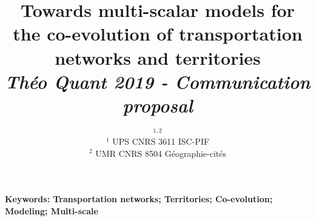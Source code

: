 




\title{\vspace{-1.5cm}Towards multi-scalar models for the co-evolution of transportation networks and territories\\\medskip
\textit{Théo Quant 2019 - Communication proposal}\\
}
\author{$^{1,2}$\\
$^1$ UPS CNRS 3611 ISC-PIF\\
$^2$ UMR CNRS 8504 Géographie-cités
}
\date{}

\maketitle

\justify


\begin{abstract}
\end{abstract}


\vspace{-1cm}

\textbf{Keywords: Transportation networks; Territories; Co-evolution; Modeling; Multi-scale}

\bigskip

